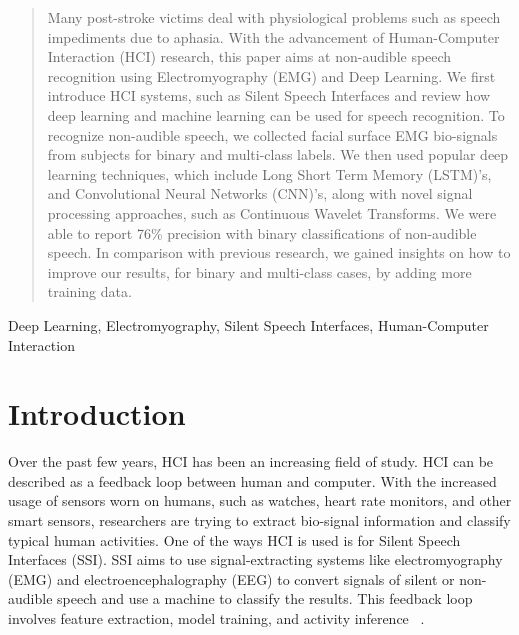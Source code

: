 \documentclass[conference]{IEEEtran}
\begin{document}
\begin{abstract}
Many post-stroke victims deal with physiological problems such as speech impediments due to aphasia. With the advancement of Human-Computer Interaction (HCI) research, this paper aims at non-audible speech recognition using Electromyography (EMG) and Deep Learning. We first introduce HCI systems, such as Silent Speech Interfaces and review how deep learning and machine learning can be used for speech recognition. To recognize non-audible speech, we collected facial surface EMG bio-signals from subjects for binary and multi-class labels. We then used popular deep learning techniques, which include Long Short Term Memory (LSTM)'s, and Convolutional Neural Networks (CNN)'s, along with novel signal processing approaches, such as Continuous Wavelet Transforms. We were able to report 76\% precision with binary classifications of non-audible speech. In comparison with previous research,  we gained insights on how to improve our results, for binary and multi-class cases, by adding more training data.
\end{abstract}
                                                                                                                                                        
\begin{IEEEkeywords}
Deep Learning, Electromyography, Silent Speech Interfaces, Human-Computer Interaction
\end{IEEEkeywords}


%
\IEEEpeerreviewmaketitle


\section{Introduction}

Over the past few years, HCI has been an increasing field of study. HCI can be described as a feedback loop between human and computer. With the increased usage of sensors worn on humans, such as watches, heart rate monitors, and other smart sensors, researchers are trying to extract bio-signal information and classify typical human activities. One of the ways HCI is used is for Silent Speech Interfaces (SSI). SSI aims to use signal-extracting systems like electromyography (EMG) and electroencephalography (EEG) to convert signals of silent or non-audible speech and use a machine to classify the results. This feedback loop involves feature extraction, model training, and activity inference ~\cite{wang_deep_2017}.
\end{document}
